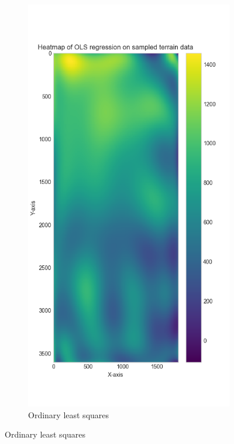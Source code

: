 \begin{figure}[H]
\begin{subfigure}[h]{0.23\textwidth}
     \end{subfigure}
     \hfill
     \begin{subfigure}[h]{0.23\textwidth}
         \centering
         \includegraphics[width=\textwidth]{Images/ols_terrain_heatmap.png}
         \caption{Ordinary least squares}

\end{subfigure}
\end{figure}
